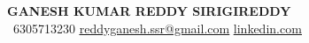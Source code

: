 \begin{center}
    \textbf{\Huge \scshape GANESH KUMAR REDDY SIRIGIREDDY} \\ \vspace{1pt}
     \ \small 6305713230 \quad
    \href{mailto:firstlast@gmail.com}{ \underline{reddyganesh.ssr@gmail.com}} \quad
    \href{https://www.linkedin.com/in/sirigireddyganeshreddy}{ \underline{linkedin.com}} \quad
\end{center}